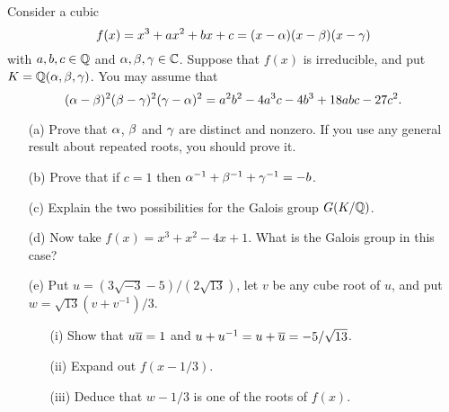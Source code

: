 \documentclass[a4paper]{article}
\begin{document}
\begin{problem}%
 Consider a cubic 
 \[ f(x) = x^3+ax^2+bx+c = (x-\alpha)(x-\beta)(x-\gamma) \]
 with $a,b,c\in{\mathbb{Q}}$ and $\alpha,\beta,\gamma\in{\mathbb{C}}$.  Suppose that $f(x)$ is
 irreducible, and put $K={\mathbb{Q}}(\alpha,\beta,\gamma)$.  You may assume that
 \[ (\alpha-\beta)^2(\beta-\gamma)^2(\gamma-\alpha)^2 =
     a^2b^2-4a^3c-4b^3+18abc-27c^2.
 \] 
 \begin{itemize}
  \item[(a)] Prove that $\alpha$, $\beta$ and $\gamma$ are distinct and
   nonzero.  If you use any general result about repeated roots, you
   should prove it.  
  \item[(b)] Prove that if $c=1$ then
   $\alpha^{-1}+\beta^{-1}+\gamma^{-1}=-b$.  
  \item[(c)] Explain the two possibilities for the Galois group
   $G(K/{\mathbb{Q}})$. 
  \item[(d)] Now take $f(x)=x^3+x^2-4x+1$.  What is the Galois group
   in this case? 
  \item[(e)] Put $u=(3\sqrt{-3}-5)/(2\sqrt{13})$, let $v$ be any cube
   root of $u$, and put $w=\sqrt{13}(v+v^{-1})/3$.  
   \begin{itemize}
    \item[(i)] Show that $u\overline{u}=1$ and
     $u+u^{-1}=u+\overline{u}=-5/\sqrt{13}$.
    \item[(ii)] Expand out $f(x-1/3)$.
    \item[(iii)] Deduce that $w-1/3$ is one of the roots of
     $f(x)$. 
   \end{itemize} 
 \end{itemize}
\end{problem}
\end{document}
